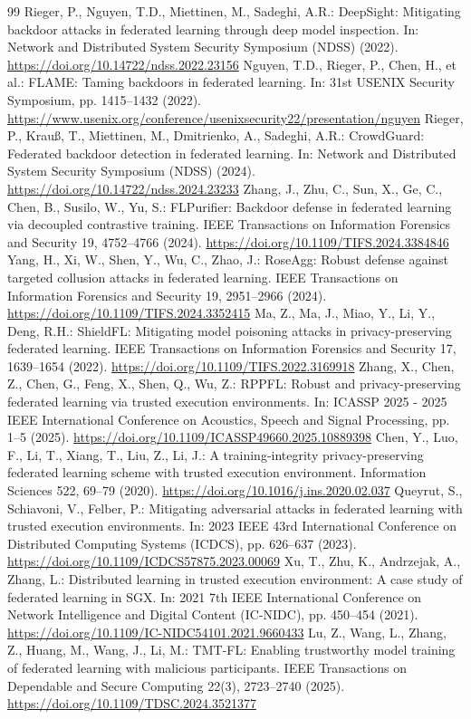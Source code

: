 \documentclass[10pt,a4paper,UTF8,fontset=fandol]{ctexart}
\begin{document}
\begin{thebibliography}{99}
     Rieger, P., Nguyen, T.D., Miettinen, M., Sadeghi, A.R.: DeepSight: Mitigating backdoor attacks in federated learning through deep model inspection. In: Network and Distributed System Security Symposium (NDSS) (2022). \url{https://doi.org/10.14722/ndss.2022.23156}
     Nguyen, T.D., Rieger, P., Chen, H., et al.: FLAME: Taming backdoors in federated learning. In: 31st USENIX Security Symposium, pp. 1415--1432 (2022). \url{https://www.usenix.org/conference/usenixsecurity22/presentation/nguyen}
     Rieger, P., Krau{\ss}, T., Miettinen, M., Dmitrienko, A., Sadeghi, A.R.: CrowdGuard: Federated backdoor detection in federated learning. In: Network and Distributed System Security Symposium (NDSS) (2024). \url{https://doi.org/10.14722/ndss.2024.23233}
     Zhang, J., Zhu, C., Sun, X., Ge, C., Chen, B., Susilo, W., Yu, S.: FLPurifier: Backdoor defense in federated learning via decoupled contrastive training. IEEE Transactions on Information Forensics and Security 19, 4752--4766 (2024). \url{https://doi.org/10.1109/TIFS.2024.3384846}
     Yang, H., Xi, W., Shen, Y., Wu, C., Zhao, J.: RoseAgg: Robust defense against targeted collusion attacks in federated learning. IEEE Transactions on Information Forensics and Security 19, 2951--2966 (2024). \url{https://doi.org/10.1109/TIFS.2024.3352415}
     Ma, Z., Ma, J., Miao, Y., Li, Y., Deng, R.H.: ShieldFL: Mitigating model poisoning attacks in privacy-preserving federated learning. IEEE Transactions on Information Forensics and Security 17, 1639--1654 (2022). \url{https://doi.org/10.1109/TIFS.2022.3169918}
     Zhang, X., Chen, Z., Chen, G., Feng, X., Shen, Q., Wu, Z.: RPPFL: Robust and privacy-preserving federated learning via trusted execution environments. In: ICASSP 2025 - 2025 IEEE International Conference on Acoustics, Speech and Signal Processing, pp. 1--5 (2025). \url{https://doi.org/10.1109/ICASSP49660.2025.10889398}
     Chen, Y., Luo, F., Li, T., Xiang, T., Liu, Z., Li, J.: A training-integrity privacy-preserving federated learning scheme with trusted execution environment. Information Sciences 522, 69--79 (2020). \url{https://doi.org/10.1016/j.ins.2020.02.037}
     Queyrut, S., Schiavoni, V., Felber, P.: Mitigating adversarial attacks in federated learning with trusted execution environments. In: 2023 IEEE 43rd International Conference on Distributed Computing Systems (ICDCS), pp. 626--637 (2023). \url{https://doi.org/10.1109/ICDCS57875.2023.00069}
     Xu, T., Zhu, K., Andrzejak, A., Zhang, L.: Distributed learning in trusted execution environment: A case study of federated learning in SGX. In: 2021 7th IEEE International Conference on Network Intelligence and Digital Content (IC-NIDC), pp. 450--454 (2021). \url{https://doi.org/10.1109/IC-NIDC54101.2021.9660433}
     Lu, Z., Wang, L., Zhang, Z., Huang, M., Wang, J., Li, M.: TMT-FL: Enabling trustworthy model training of federated learning with malicious participants. IEEE Transactions on Dependable and Secure Computing 22(3), 2723--2740 (2025). \url{https://doi.org/10.1109/TDSC.2024.3521377}


\end{thebibliography}
\end{document}
